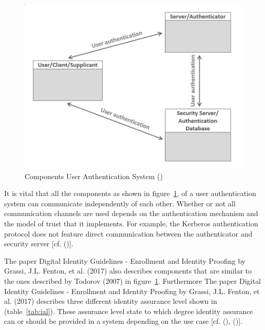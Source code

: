 \begin{figure}[h]
	\centering
	\includegraphics[width=0.8\linewidth]{images/identity_proofing_architectur}
	\caption[Componets Authentication]{Components User Authentication System (\cite{Todorov:2007:MUI})}
	\label{fig:componentsuserauthenticationsystem}
\end{figure}



It is vital that all the components as shown in figure~\ref{fig:componentsuserauthenticationsystem}, of a user authentication system can communicate independently of each other. Whether or not all communication channels are used depends on the authentication mechanism and the model of trust that it implements. For example, the Kerberos authentication protocol does not feature direct communication between the authenticator and security server [cf. (\cite{Todorov:2007:MUI})]. 

The paper Digital Identity Guidelines - Enrollment and Identity Proofing by Grassi, J.L. Fenton, et al. (2017) also describes components that are similar to the ones described by Todorov (2007) in figure~\ref{fig:componentsuserauthenticationsystem}. Furthermore The paper Digital Identity Guidelines - Enrollment and Identity Proofing by Grassi, J.L. Fenton, et al. (2017) describes three different identity assurance level shown in (table~\ref{tab:ial}). These assurance level state to which degree identity assurance can or should be provided in a system depending on the use case [cf. (\cite{NIST:2017:DIGEIP}), (\cite{Todorov:2007:MUI})]. 


